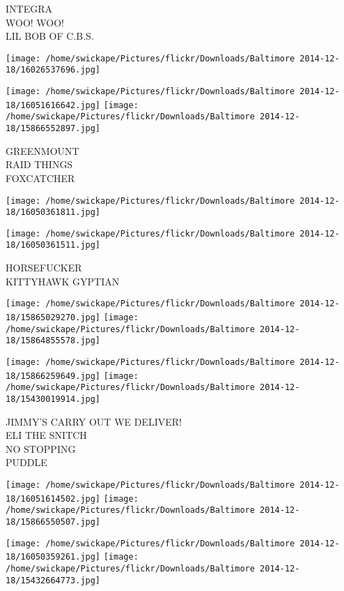 \documentclass[10pt,letterpaper]{article}
\begin{document}
INTEGRA\\
WOO!  WOO!\\
LIL BOB OF C.B.S.\\
\pagebreak

\texttt{[image: /home/swickape/Pictures/flickr/Downloads/Baltimore 2014-12-18/16026537696.jpg]}

\vspace{0.25in}
\texttt{[image: /home/swickape/Pictures/flickr/Downloads/Baltimore 2014-12-18/16051616642.jpg]}
\texttt{[image: /home/swickape/Pictures/flickr/Downloads/Baltimore 2014-12-18/15866552897.jpg]}

GREENMOUNT\\
RAID THINGS\\
FOXCATCHER\\
\pagebreak

\texttt{[image: /home/swickape/Pictures/flickr/Downloads/Baltimore 2014-12-18/16050361811.jpg]}

\vspace{0.25in}
\texttt{[image: /home/swickape/Pictures/flickr/Downloads/Baltimore 2014-12-18/16050361511.jpg]}

HORSEFUCKER\\
KITTYHAWK GYPTIAN\\
\pagebreak

\texttt{[image: /home/swickape/Pictures/flickr/Downloads/Baltimore 2014-12-18/15865029270.jpg]}
\texttt{[image: /home/swickape/Pictures/flickr/Downloads/Baltimore 2014-12-18/15864855578.jpg]}

\texttt{[image: /home/swickape/Pictures/flickr/Downloads/Baltimore 2014-12-18/15866259649.jpg]}
\texttt{[image: /home/swickape/Pictures/flickr/Downloads/Baltimore 2014-12-18/15430019914.jpg]}

JIMMY'S CARRY OUT WE DELIVER!\\
ELI THE SNITCH\\
NO STOPPING\\
PUDDLE\\
\pagebreak

\texttt{[image: /home/swickape/Pictures/flickr/Downloads/Baltimore 2014-12-18/16051614502.jpg]}
\texttt{[image: /home/swickape/Pictures/flickr/Downloads/Baltimore 2014-12-18/15866550507.jpg]}

\texttt{[image: /home/swickape/Pictures/flickr/Downloads/Baltimore 2014-12-18/16050359261.jpg]}
\texttt{[image: /home/swickape/Pictures/flickr/Downloads/Baltimore 2014-12-18/15432664773.jpg]}
\end{document}
